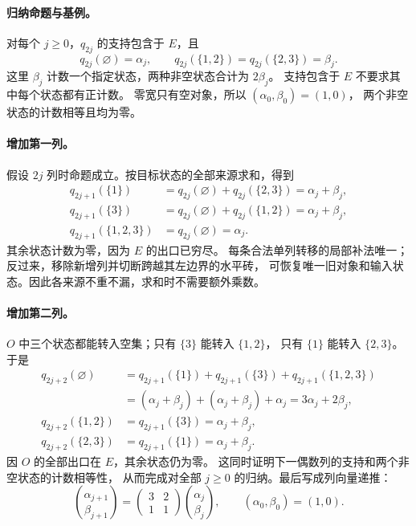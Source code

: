 \paragraph{归纳命题与基例。}
对每个 $j\ge0$，$q_{2j}$ 的支持包含于 $E$，且
\[
 q_{2j}(\varnothing)=\alpha_j,\qquad
 q_{2j}(\{1,2\})=q_{2j}(\{2,3\})=\beta_j.
\]
这里 $\beta_j$ 计数一个指定状态，两种非空状态合计为 $2\beta_j$。
支持包含于 $E$ 不要求其中每个状态都有正计数。
零宽只有空对象，所以 $(\alpha_0,\beta_0)=(1,0)$，
两个非空状态的计数相等且均为零。

\paragraph{增加第一列。}
假设 $2j$ 列时命题成立。按目标状态的全部来源求和，得到
\[
\begin{aligned}
q_{2j+1}(\{1\})
 &=q_{2j}(\varnothing)+q_{2j}(\{2,3\})=\alpha_j+\beta_j,\\
q_{2j+1}(\{3\})
 &=q_{2j}(\varnothing)+q_{2j}(\{1,2\})=\alpha_j+\beta_j,\\
q_{2j+1}(\{1,2,3\})&=q_{2j}(\varnothing)=\alpha_j.
\end{aligned}
\]
其余状态计数为零，因为 $E$ 的出口已穷尽。
每条合法单列转移的局部补法唯一；反过来，移除新增列并切断跨越其左边界的水平砖，
可恢复唯一旧对象和输入状态。因此各来源不重不漏，求和时不需要额外乘数。

\paragraph{增加第二列。}
$O$ 中三个状态都能转入空集；只有 $\{3\}$ 能转入 $\{1,2\}$，
只有 $\{1\}$ 能转入 $\{2,3\}$。于是
\[
\begin{aligned}
q_{2j+2}(\varnothing)
 &=q_{2j+1}(\{1\})+q_{2j+1}(\{3\})+q_{2j+1}(\{1,2,3\})\\
 &=(\alpha_j+\beta_j)+(\alpha_j+\beta_j)+\alpha_j
   =3\alpha_j+2\beta_j,\\
q_{2j+2}(\{1,2\})&=q_{2j+1}(\{3\})=\alpha_j+\beta_j,\\
q_{2j+2}(\{2,3\})&=q_{2j+1}(\{1\})=\alpha_j+\beta_j.
\end{aligned}
\]
因 $O$ 的全部出口在 $E$，其余状态仍为零。
这同时证明下一偶数列的支持和两个非空状态的计数相等性，
从而完成对全部 $j\ge0$ 的归纳。最后写成列向量递推：
\begin{equation}\label{eq:two-dimensional}
 \binom{\alpha_{j+1}}{\beta_{j+1}}
 =\begin{pmatrix}3&2\\1&1\end{pmatrix}
 \binom{\alpha_j}{\beta_j},\qquad
 (\alpha_0,\beta_0)=(1,0).
\end{equation}

